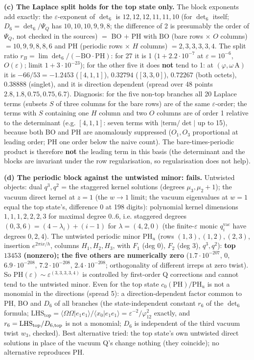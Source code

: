 \documentclass[10pt]{article}
\begin{document}
\textbf{(c) The Laplace split holds for the top state only.} The block exponents add exactly: the $\varepsilon$-exponent of $\det_6$ is $12,12,12,11,11,10$ (for $\det_6$ itself; $D_6=\det_6/\Psi_Q$ has $10,10,10,9,9,8$; the difference of 2 is presumably the order of $\Psi_Q$, not checked in the sources) $=$ BO $+$ PH with $\mathrm{BO}$ (bare rows $\times$ $O$ columns) $=10,9,9,8,8,6$ and $\mathrm{PH}$ (periodic rows $\times$ $H$ columns) $=2,3,3,3,3,4$. The split ratio $r_B=\lim\det_6/(-\mathrm{BO}\cdot\mathrm{PH})$: for 27 it is 1 ($1+2.2\cdot10^{-7}$ at $\varepsilon=10^{-6}$, $O(\varepsilon)$; limit $1+3\cdot10^{-23}$); for the other five it does \textbf{not} tend to 1: at $(\varphi,\omega\,\mathrm{A})$ it is $-66/53=-1.2453$ ($[4,1,1]$), $0.32794$ ($[3,3,0]$), $0.72267$ (both octets), $0.38888$ (singlet), and it is direction dependent (spread over 48 points $2.8,1.8,0.75,0.75,6.7$). Diagnosis: for the five non-top branches all 20 Laplace terms (subsets $S$ of three columns for the bare rows) are of the same $\varepsilon$-order; the terms with $S$ containing one $H$ column and two $O$ columns are of order 1 relative to the determinant (e.g. $[4,1,1]$: seven terms with $|\mathrm{term}/\det|$ up to 15), because both BO and PH are anomalously suppressed ($O_1,O_3$ proportional at leading order; PH one order below the naive count). The bare-times-periodic product is therefore \textbf{not} the leading term in this basis (the determinant and the blocks are invariant under the row regularisation, so regularisation does not help).

\textbf{(d) The periodic block against the untwisted minor: fails.} Untwisted objects: dual $q^3,q^2$ = the staggered kernel solutions (degrees $\mu_3,\mu_2+1$); the vacuum direct kernel at $z=1$ (the $w\to1$ limit; the vacuum eigenvalues at $w=1$ equal the top state's, difference 0 at 198 digits): polynomial kernel dimensions $1,1,1,2,2,2,3$ for maximal degree $0..6$, i.e. staggered degrees $(0,3,6)=(4-\lambda_i)+(i-1)$ for $\lambda=(4,2,0)$ (the finite-$\varepsilon$ monic $q_i^{\mathrm{vac}}$ have degrees $0,2,4$). The untwisted periodic minor $\mathrm{PH}_u$ (rows $(1,3),(1,2),(2,3)$, insertion $e^{2\pi ix/h}$, columns $H_1,H_2,H_3$, with $F_1$ (deg 0), $F_2$ (deg 3), $q^3,q^2$): \textbf{top $13453$ (nonzero); the five others are numerically zero} ($1.7\cdot10^{-207}$, 0, $6.9\cdot10^{-208}$, $7.2\cdot10^{-208}$, $2.4\cdot10^{-208}$; orthogonality of different irreps at zero twist). So $\mathrm{PH}(\varepsilon)\sim\varepsilon^{(3,3,3,3,4)}$ is controlled by first-order Q corrections and cannot tend to the untwisted minor. Even for the top state $c_0(\mathrm{PH})/\mathrm{PH}_u$ is not a monomial in the directions (spread 5): a direction-dependent factor common to PH, BO and $D_6$ of all branches (the state-independent constant $r_6$ of the $\det_6$ formula; $\mathrm{LHS}_{\mathrm{top}}=\langle\Omega\Omega|e_1e_1\rangle/\langle x_0|e_1e_1\rangle=\varepsilon^{-2}/\varphi_{12}^2$ exactly, and $r_6=\mathrm{LHS}_{\mathrm{top}}/D_{6,\rm top}$ is not a monomial; $D_6$ is independent of the third vacuum twist $w_3$, checked). Best alternative tried: the top state's own untwisted direct solutions in place of the vacuum Q's change nothing (they coincide); no alternative reproduces PH.
\end{document}
